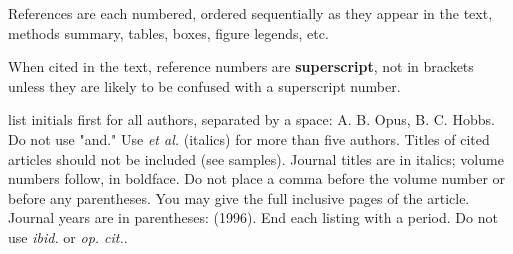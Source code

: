 \newcommand{\bib}{\bibitem}
\def\arpc{Ann. Rev. Phys. Chem.~~}
\def\irpc{Int. Rev. Phys. Chem.~~}
\def\jcp{J. Chem. Phys.~~}
\def\jacs{J. Am. Chem. Soc.~~}
\def\acp{Adv. Chem. Phys.~~}
\def\cp{Chem. Phys.~~}
\def\cpc{Comput. Phys. Commun.~~}
\def\cpr{Comput. Phys. Rep.~~}
\def\csr{Chem. Soc. Rev.~~}
\def\cpl{Chem. Phys. Lett.~~}
\def\cjc{Can. J. Chem.~~}
\def\cs{Curr. Sci.~~}
\def\acr{Acc. Chem. Res.~~}
\def\mph{Mol. Phys.~~}
\def\prl{Phys. Rev. Lett.~~}
\def\jpc{J. Phys. Chem.~~}
\def\joc{J. Org. Chem.~~}
\def\jms{J. Mol.  Structure~~}
\def\josab{J. Opt. Soc. Am. B~~}
\def\jao{J. Appl. Opt.~~}
\def\ijqc{Int. J. Quant. Chem.~~}
\def\sc{Science~~}
\def\tca{Theoret. Chim. Acta~~}
\def\pr{Phys. Rep.~~}
\def\ssr{Surf. Sci. Reports~~}
\def\prb{Phys. Rev. B~~}
\def\pra{Phys. Rev. A~~}
\def\prs{Proc. Roy. Soc.~~}
\def\pias{Proc. Indian Acad. Sci.~~}
\def\rpp{Rep. Prog. Phys.~~}
\def\pla{Phys. Letters A~~}
\def\fdcs{Faraday Discuss. Chem. Soc.~~}
\def\jcsft{J. Chem. Soc. Faraday Trans.~~}
\def\jrs{J. Raman Spectry.~~}
\def\rmp{Rev. Mod. Phys.~~}

\clearpage
{}


\baselineskip 15pt
\setlength{\parskip}{10pt}

\noindent References are each numbered, ordered sequentially as they appear in the text, methods summary, tables, boxes, figure legends, etc. 

\noindent When cited in the text, reference numbers are {\bf superscript}, not in brackets unless they are likely to be confused with a superscript number.


 list initials first for all authors, separated by a space: A. B. Opus, B. C. Hobbs. Do not use "and." Use {\em et al.} (italics) for more than five authors. Titles of cited articles should not be included (see samples). Journal titles are in italics; volume numbers follow, in boldface. Do not place a comma before the volume number or before any parentheses. You may give the full inclusive pages of the article. Journal years are in parentheses: (1996). End each listing with a period. Do not use {\em ibid.} or {\em op. cit.}.

